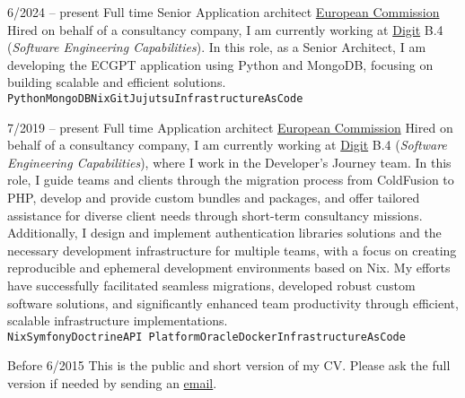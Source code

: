 \begin{entrylist}
	\entry
		{6/2024 -- present}
        {Full time}
		{Senior Application architect}
        {\href{https://ec.europa.eu/}{European Commission}}
        {
            Hired on behalf of a consultancy company, I am currently working at
            \href{https://ec.europa.eu/info/departments/informatics_en}{Digit} B.4 (\textit{Software Engineering Capabilities}).
			In this role, as a Senior Architect, I am developing the ECGPT application using Python and MongoDB,
			focusing on building scalable and efficient solutions.
			\\ \texttt{Python}\slashsep\texttt{MongoDB}\slashsep\texttt{Nix}\slashsep\texttt{Git}\slashsep\texttt{Jujutsu}\slashsep\texttt{InfrastructureAsCode}
        }

	\entry
		{7/2019 -- present}
        {Full time}
		{Application architect}
        {\href{https://ec.europa.eu/}{European Commission}}
        {
            Hired on behalf of a consultancy company, I am currently working at
            \href{https://ec.europa.eu/info/departments/informatics_en}{Digit} B.4 (\textit{Software Engineering Capabilities}),
            where I work in the Developer's Journey team. In this role, I guide teams and clients
            through the migration process from ColdFusion to PHP, develop and provide custom
            bundles and packages, and offer tailored assistance for diverse client needs through
            short-term consultancy missions. Additionally, I design and implement authentication libraries
            solutions and the necessary development infrastructure for multiple teams, with
            a focus on creating reproducible and ephemeral development environments based on Nix.
            My efforts have successfully facilitated seamless migrations, developed robust custom
            software solutions, and significantly enhanced team productivity through efficient,
            scalable infrastructure implementations.
			\\ \texttt{Nix}\slashsep\texttt{Symfony}\slashsep\texttt{Doctrine}\slashsep\texttt{API Platform}\slashsep\texttt{Oracle}\slashsep\texttt{Docker}\slashsep\texttt{InfrastructureAsCode}
        }

    \entry
        {\color{black!50}Before 6/2015}
        {}
        {}
        {}
        {\footnotesize{\color{black!50}This is the public and short version of my CV. Please ask the full version if needed by sending an \href{mailto:pol.dellaiera@protonmail.com}{email}.}}
\end{entrylist}

